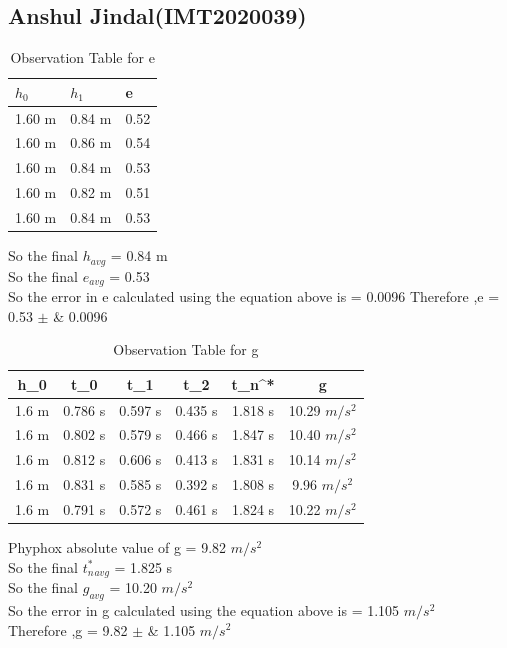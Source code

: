 \documentclass[11pt]{scrartcl} %
\begin{document}
\subsection{Anshul Jindal(IMT2020039)}

\begin{table}[h] %
	\centering %
	\begin{tabular}{l l l}
		\toprule
		\textbf{$h_0$} & \textbf{$h_1$} & \textbf{e} \\
		\midrule
		1.60 m & 0.84 m & 0.52\\
        1.60 m & 0.86 m & 0.54\\
        1.60 m & 0.84 m & 0.53\\
        1.60 m & 0.82 m & 0.51 \\
        1.60 m & 0.84 m & 0.53 \\
		\bottomrule
	\end{tabular}
	\caption{Observation Table for e}
\end{table}
So the final $h_{avg}$ = 0.84 m\\
So the final $e_{avg}$ = 0.53\\
So the error in e calculated using the equation above is  = 0.0096 \newline
Therefore ,e = 0.53  $\pm$ &  0.0096 \\

\begin{table}[h]
\centering
\begin{tabular}{||c c c c c c||} 
\toprule
 \hline
 h_0 & t_0 & t_1 & t_2 & t_n^* & g \\ [0.5ex] 
 \midrule
 \hline\hline
 1.6 m & 0.786 s & 0.597 s  & 0.435 s & 1.818 s & 10.29 $m/s^2$ \\
 \hline
 1.6 m & 0.802 s & 0.579 s & 0.466 s & 1.847 s & 10.40 $m/s^2$  \\
 \hline
 1.6 m & 0.812 s & 0.606 s & 0.413 s & 1.831 s  & 10.14 $m/s^2$ \\
 \hline
 1.6 m & 0.831 s & 0.585 s & 0.392 s & 1.808 s  & 9.96 $m/s^2$  \\
 \hline
 1.6 m & 0.791 s & 0.572 s & 0.461 s & 1.824 s  & 10.22 $m/s^2$ \\ [1ex]
 \bottomrule
 \hline
\end{tabular}
\caption{Observation Table for g}
\end{table}
Phyphox absolute value of g = 9.82 $m/s^2$\\
So the final $t_n^*_{avg}$ = 1.825 s\\
So the final $g_{avg}$ = 10.20 $m/s^2$\\
So the error in g calculated using the equation above is  = 1.105  $m/s^2$\\
Therefore ,g = 9.82  $\pm$ &  1.105 $m/s^2$ \\
\newpage
\end{document}
